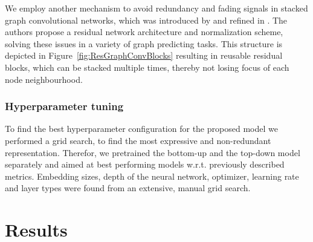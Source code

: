 \documentclass{bioinfo}
\begin{document}
We employ another mechanism to avoid redundancy and fading signals in stacked graph convolutional networks, which was introduced by \citet{DeepGCN2019} and refined in \citet{DeeperGCN2020}. The authors propose a residual network architecture and normalization scheme, solving these issues in a variety of graph predicting tasks. This structure is depicted in Figure~\ref{fig:ResGraphConvBlocks} resulting in reusable residual blocks, which can be stacked multiple times, thereby not losing focus of each node neighbourhood. \\



\subsubsection{Hyperparameter tuning}
To find the best hyperparameter configuration for the proposed model we performed a grid search, to find the most expressive and non-redundant representation. Therefor, we pretrained the bottom-up and the top-down model separately and aimed at best performing models w.r.t. previously described metrics. Embedding sizes, depth of the neural network, optimizer, learning rate and layer types were found from an extensive, manual grid search. 


\section{Results}
\end{document}
